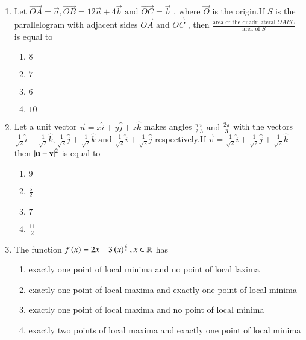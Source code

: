 \documentclass[journal]{IEEEtran}
\begin{document}
\begin{enumerate}
\item Let $\vec{OA} = \vec{a} , \vec{OB} = 12\vec{a} + 4\vec{b} \text{ and } \vec{OC} = \vec{b}$ , where $\vec{O}$ is the origin.If $S$ is the parallelogram with adjacent sides $\vec{OA}$ and $\vec{OC}$ , then $\frac{\text{area of the quadrilateral }OABC}{\text{area of }S}$ is equal to 
\begin{multicols}{2}
\begin{enumerate}
\item $8$
\item $7$
\item $6$
\item $10$
\end{enumerate}
\end{multicols}
\item Let a unit vector $\vec{u} = x\hat{i}+y\hat{j}+z\hat{k}$ makes angles $\frac{\pi}{2} \frac{\pi}{3} \text{ and } \frac{2\pi}{3}$ with the vectors $\frac{1}{\sqrt{2}}\hat{i}+\frac{1}{\sqrt{2}}\hat{k} , \frac{1}{\sqrt{2}}\hat{j}+\frac{1}{\sqrt{2}}\hat{k} \text{ and } \frac{1}{\sqrt{2}}\hat{i}+\frac{1}{\sqrt{2}}\hat{j}$ respectively.If $\vec{v} = \frac{1}{\sqrt{2}}\hat{i}+\frac{1}{\sqrt{2}}\hat{j}+\frac{1}{\sqrt{2}}\hat{k}$ then $\left\vert\mathbf{u} - \mathbf{v}\right\vert^2 $ is equal to
\begin{multicols}{2}
\begin{enumerate}
\item $9$\\
\item $\frac{5}{2}$
\item $7$\\
\item $\frac{11}{2}$
\end{enumerate}
\end{multicols}
\item The function $f\left(x\right) = 2x + 3\left(x\right)^{\frac{2}{3}} , x \in \mathbb{R} $ has
	\begin{enumerate}
		\item exactly one point of local minima and no point of local laxima
		\item exactly one point of local maxima and exactly one point of local minima
		\item exactly one point of local maxima and no point of local minima
		\item exactly two points of local maxima and exactly one point of local minima\\
	\end{enumerate}

\end{enumerate}
\end{document}
